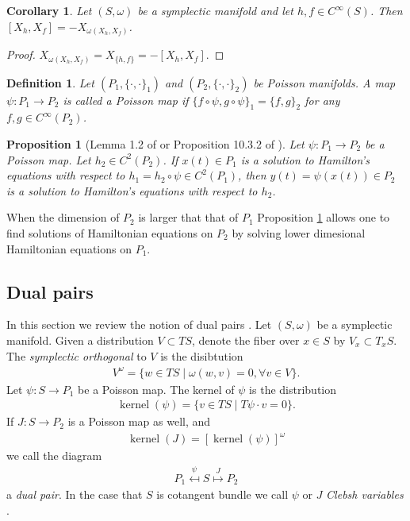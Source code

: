 \documentclass[12pt]{amsart}
\newtheorem{prop}[thm]{Proposition}
\newtheorem{cor}[thm]{Corollary}
\newtheorem{defn}[thm]{Definition}
\DeclareMathOperator{\kernel}{kernel}
\begin{document}
\begin{cor} \label{cor:Lie_hom}
  Let $(S,\omega)$ be a symplectic manifold
  and let $h,f \in C^{\infty}(S)$.
  Then $[X_h , X_f] = -X_{\omega(X_h,X_f) }$.
\end{cor}
\begin{proof}
  $X_{\omega(X_h,X_f)} = X_{ \{h,f\} } = -[X_h , X_f]$.
\end{proof}

\begin{defn}
  Let $(P_1, \{ \cdot , \cdot \}_1)$ and $(P_2, \{ \cdot , \cdot \}_2)$
  be Poisson manifolds.
  A map $\psi:P_1 \to P_2$ is called a
  \emph{Poisson map} if $\{ f \circ \psi , g \circ \psi \}_1 = \{ f , g \}_2$  for any $f,g \in C^{\infty}(P_2)$.
\end{defn}


\begin{prop}[Lemma 1.2 of \cite{Weinstein1983} or Proposition 10.3.2 of \cite{MandS}] \label{prop:Poisson_dynamics}
  Let $\psi:P_1 \to P_2$ be a Poisson map.
  Let $h_2 \in C^2(P_2)$.
  If $x(t) \in P_1$ is a solution to Hamilton's equations with respect
  to $h_1 = h_2 \circ \psi \in C^2(P_1)$, then $y(t) = \psi(x(t)) \in P_2$ is a solution
  to Hamilton's equations with respect to $h_2$.
\end{prop}

  When the dimension of $P_2$ is larger that that of $P_1$
  Proposition \ref{prop:Poisson_dynamics} allows one to find solutions of
  Hamiltonian equations on $P_2$
  by solving lower dimesional Hamiltonian equations
  on $P_1$.
  \subsection{Dual pairs}
  In this section we review the notion of dual pairs
  \cite{MarsdenWeinstein1983,Weinstein1983,Gay-BalmazVizman2011}.
  Let $(S,\omega)$ be a symplectic manifold.
  Given a distribution $V \subset TS$, denote the fiber over 
  $x \in S$ by $V_x \subset T_x S$.
  The \emph{symplectic orthogonal} to $V$ is the disibtution
  \begin{align*}
    V^\omega = \{ w \in TS \mid \omega( w , v ) = 0, \forall v \in V \}.
  \end{align*}
  Let $\psi:S \to P_1$ be a Poisson map.
  The kernel of $\psi$ is the distribution
  \begin{align*}
    \kernel(\psi) = \{ v \in TS \mid T\psi \cdot v  = 0 \}.
  \end{align*}
  If $J:S \to P_2$ is a Poisson map as well, and
  \begin{align*}
    \kernel(J) =  [\kernel(\psi) ]^\omega
  \end{align*}
  we call the diagram
  \begin{align*}
    P_1 \stackrel{\psi}{\mapsfrom} S \stackrel{J}{\mapsto} P_2
  \end{align*}
  a \emph{dual pair}.
  In the case that $S$ is cotangent bundle we call $\psi$ or $J$
  \emph{Clebsh variables} \cite{MarsdenWeinstein1983}.
\end{document}
